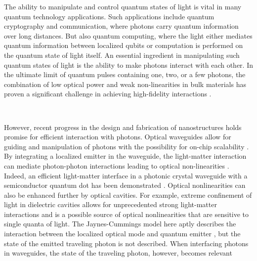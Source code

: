 The ability to manipulate and control quantum states of light is vital in many quantum technology applications. Such applications include quantum cryptography and communication, where photons carry quantum information over long distances. But also quantum computing, where the light either mediates quantum information between localized qubits or computation is performed on the quantum state of light itself. An essential ingredient in manipulating such quantum states of light is the ability to make photons interact with each other. In the ultimate limit of quantum pulses containing one, two, or a few photons, the combination of low optical power and weak non-linearities in bulk materials has proven a significant challenge in achieving high-fidelity interactions \cite{Chang2014QuantumPhoton}. 

\

However, recent progress in the design and fabrication of nanostructures holds promise for efficient interaction with photons. Optical waveguides allow for guiding and manipulation of photons with the possibility for on-chip scalability \cite{Lodahl2015InterfacingNanostructures}. 
By integrating a localized emitter in the waveguide, the light-matter interaction can mediate photon-photon interactions leading to optical non-linearities \cite{Chang2014QuantumPhoton}. Indeed, an efficient light-matter interface in a photonic crystal waveguide with a semiconductor quantum dot has been demonstrated \cite{LeJeannic2022DynamicalEmitter}. Optical nonlinearities can also be enhanced further by optical cavities. For example, extreme confinement of light in dielectric cavities allows for unprecedented strong light-matter interactions \cite{Choi2017Self-SimilarNonlinearities,Wang2018MaximizingCavities,Hu2018ExperimentalResonators,Albrechtsen2022Nanometer-scaleCavities} and is a possible source of optical nonlinearities that are sensitive to single quanta of light. The Jaynes-Cummings model here aptly describes the interaction between the localized optical mode and quantum emitter \cite{Jaynes1963ComparisonMaser}, but the state of the emitted traveling photon is not described. When interfacing photons in waveguides, the state of the traveling photon, however, becomes relevant \cite{Sheremet2023WaveguideCorrelations}

\

